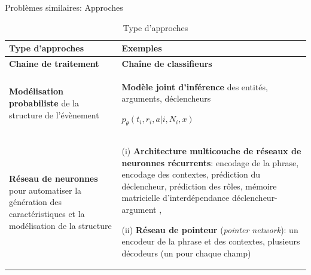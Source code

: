 \documentclass[newPxFont,pagenumber]{beamer}
\begin{document}
%

\begin{frame}{Problèmes similaires: Approches}
\scriptsize
\begin{table}
\scriptsize
\begin{tabular}{|p{}|p{}|}
\hline
\textbf{Type d'approches} & \textbf{Exemples} \\ \hline
\textbf{Chaine de traitement} & \textbf{Chaîne de classifieurs  }\cite{ahn2006stages} \\ \hline
\textbf{Modélisation probabiliste} de la structure de l'évènement & \textbf{Modèle joint d'inférence} des entités, arguments, déclencheurs

$p_\theta(t_i, r_i, a \vert i, N_i, x)$ \cite{yang2016jointEntityEvt} %
\\ \hline
\textbf{Réseau de neuronnes} pour automatiser la génération des caractéristiques et la modélisation de la structure & (i) \textbf{Architecture multicouche de réseaux de neuronnes récurrents}: encodage de la phrase, encodage des contextes, prédiction du déclencheur, prédiction des rôles, mémoire matricielle d'interdépendance déclencheur-argument \cite{nguyen2016jointtrgarg},  

(ii) \textbf{Réseau de pointeur} (\textit{pointer network}): un encodeur de la phrase et des contextes, plusieurs décodeurs (un pour chaque champ) \cite{palm2017e2e-dnn} \\ \hline
\end{tabular}
\caption{\scriptsize Type d'approches}
\end{table}
\end{frame}
\end{document}
